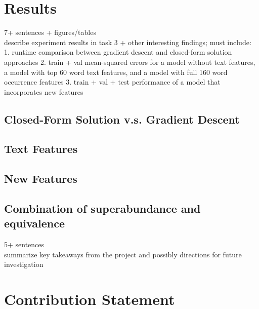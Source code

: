 \documentclass[letterpaper, 12pt]{article}
\renewcommand{\headrulewidth}{0pt}
\renewcommand{\footrulewidth}{0pt}
\begin{document}
\section*{Results}
7+ sentences + figures/tables\\
describe experiment results in task 3 + other interesting findings; must include:\\
1. runtime comparison between gradient descent and closed-form solution approaches
2. train + val mean-squared errors for a model without text features, a model with top 60 word text features, and a model with full 160 word occurrence features
3. train + val + test performance of a model that incorporates new features
\subsection*{Closed-Form Solution v.s. Gradient Descent}
\subsection*{Text Features}
\subsection*{New Features}

\subsection*{Combination of superabundance and equivalence}
5+ sentences\\
summarize key takeaways from the project and possibly directions for future investigation


\section*{Contribution Statement}




\nocite{*}





\begingroup


    


\endgroup
\renewcommand{\thepage}{}

%






\end{document}
